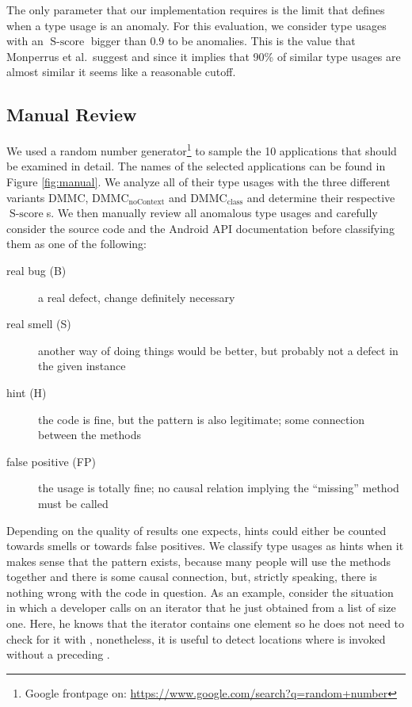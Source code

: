 The only parameter that our implementation requires is the limit that defines when a type usage is an anomaly.
For this evaluation, we consider type usages with an $\operatorname{S-score}$ bigger than $0.9$ to be anomalies.
This is the value that Monperrus et al.\ suggest and since it implies that 90\% of similar type usages are almost similar it seems like a reasonable cutoff.

\subsection{Manual Review}

We used a random number generator\footnote{Google frontpage on: \url{https://www.google.com/search?q=random+number}} to sample the 10 applications that should be examined in detail.
The names of the selected applications can be found in Figure \ref{fig:manual}.
We analyze all of their type usages with the three different variants $\text{DMMC}$, $\text{DMMC}_{\text{noContext}}$ and $\text{DMMC}_{\text{class}}$ and determine their respective $\operatorname{S-score}$s.
We then manually review all anomalous type usages and carefully consider the source code and the Android API documentation before classifying them as one of the following:
\begin{description}
    \item [real bug (B)] a real defect, change definitely necessary
    \item [real smell (S)] another way of doing things would be better, but probably not a defect in the given instance
    \item [hint (H)] the code is fine, but the pattern is also legitimate; some connection between the methods
    \item [false positive (FP)] the usage is totally fine; no causal relation implying the ``missing'' method must be called
\end{description}


Depending on the quality of results one expects, hints could either be counted towards smells or towards false positives.
We classify type usages as hints when it makes sense that the pattern exists, because many people will use the methods together and there is some causal connection, but, strictly speaking, there is nothing wrong with the code in question.
As an example, consider the situation in which a developer calls  on an iterator that he just obtained from a list of size one.
Here, he knows that the iterator contains one element so he does not need to check for it with , nonetheless, it is useful to detect locations where  is invoked without a preceding .

